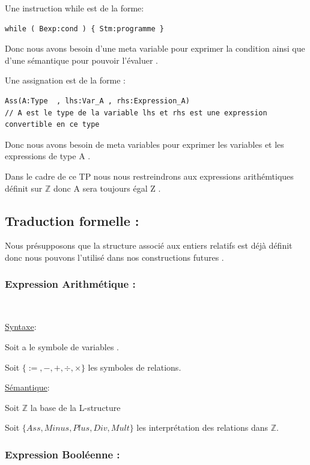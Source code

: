 \documentclass{article}
\begin{document}
\medskip

Une instruction while est de la forme:
\begin{lstlisting}[style=CStyle]
while ( Bexp:cond ) { Stm:programme }
\end{lstlisting}
Donc nous avons besoin d'une meta variable pour exprimer la condition  ainsi que d'une sémantique pour pouvoir l'évaluer . 

\medskip

Une assignation est de la forme :
\begin{lstlisting}[style=CStyle]
Ass(A:Type  , lhs:Var_A , rhs:Expression_A) 
// A est le type de la variable lhs et rhs est une expression convertible en ce type 
\end{lstlisting}
Donc nous avons besoin de meta variables pour exprimer les variables et les expressions de type A .

\medskip

\noindent  Dans le cadre de ce TP nous nous restreindrons aux expressions arithémtiques définit sur $\mathbb{Z}$ donc A sera toujours égal Z .

\subsection{Traduction formelle :}

Nous présupposons que la structure associé aux entiers relatifs est déjà définit donc nous pouvons l'utilisé dans nos constructions futures .


\subsubsection{Expression Arithmétique :}
\,

\underline{Syntaxe}:

Soit a le symbole de variables .


Soit $\{:=,-,+,\div,\times\}$ les symboles de relations.

\medskip

\underline{Sémantique}:

Soit $\mathbb{Z}$ la base de la L-structure 

Soit $\{Ass,Minus,Plus,Div,Mult\}$  les interprétation des relations dans $\mathbb{Z}$.



\subsubsection{Expression Booléenne :}
\,
\end{document}
